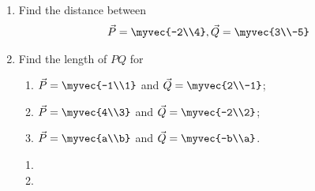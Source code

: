 
\renewcommand{\theequation}{\theenumi}
\begin{enumerate}[label=\arabic*.,ref=\thesubsection.\theenumi]


\item Find the distance between 
\begin{align}
\vec{P} = \myvec{-2\\4}, \vec{Q} = \myvec{3\\-5}
\end{align}
\solution

%
\item
Find the length of $PQ$ for
\begin{enumerate}
\item $\vec{P}=\myvec{-1\\1}$ and $\vec{Q}=\myvec{2\\-1}$;
\item $\vec{P}=\myvec{4\\3}$ and $\vec{Q}=\myvec{-2\\2}$;
\item $\vec{P}=\myvec{a\\b}$ and $\vec{Q}=\myvec{-b\\a}$.
\end{enumerate}
\solution
\begin{enumerate}
	\item 
	\item 
\end{enumerate}


\end{enumerate}
